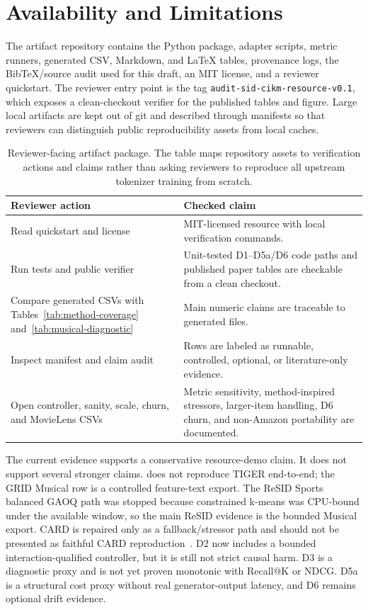 \section{Availability and Limitations}

The artifact repository contains the \tool Python package, adapter scripts,
metric runners, generated CSV, Markdown, and \LaTeX{} tables, provenance logs,
the BibTeX/source audit used for this draft, an MIT license, and a reviewer
quickstart. The reviewer entry point is the tag
\texttt{audit-sid-cikm-resource-v0.1}, which exposes a clean-checkout verifier
for the published tables and figure. Large local artifacts are kept out of git
and described through manifests so that reviewers can distinguish public
reproducibility assets from local caches.

\begin{table}[t]
\caption{Reviewer-facing artifact package. The table maps repository assets to
verification actions and claims rather than asking reviewers to reproduce all
upstream tokenizer training from scratch.}
\label{tab:artifact-package}
\small
\setlength{\tabcolsep}{3pt}
\begin{tabularx}{\columnwidth}{@{}p{}Y@{}}
\toprule
Reviewer action & Checked claim \\
\midrule
Read quickstart and license & MIT-licensed resource with local verification
commands. \\
Run tests and public verifier & Unit-tested D1--D5a/D6 code paths and published
paper tables are checkable from a clean checkout. \\
Compare generated CSVs with Tables~\ref{tab:method-coverage}
and~\ref{tab:musical-diagnostic} & Main numeric claims are traceable to
generated files. \\
Inspect manifest and claim audit & Rows are labeled as runnable, controlled,
optional, or literature-only evidence. \\
Open controller, sanity, scale, churn, and MovieLens CSVs & Metric sensitivity,
method-inspired stressors, larger-item handling, D6 churn, and non-Amazon
portability are documented. \\
\bottomrule
\end{tabularx}
\end{table}

The current evidence supports a conservative resource-demo claim. It does not
support several stronger claims. \tool does not reproduce TIGER end-to-end; the
GRID Musical row is a controlled feature-text export. The ReSID Sports balanced
GAOQ path was stopped because constrained k-means was CPU-bound under the
available window, so the main ReSID evidence is the bounded Musical export.
CARD is repaired only as a fallback/stressor path and should not be presented
as faithful CARD reproduction~\cite{wei2026card}. D2 now includes a bounded
interaction-qualified controller, but it is still not strict causal harm. D3 is a diagnostic proxy and is not yet proven
monotonic with Recall@K or NDCG. D5a is a structural cost proxy without real
generator-output latency, and D6 remains optional drift evidence.

